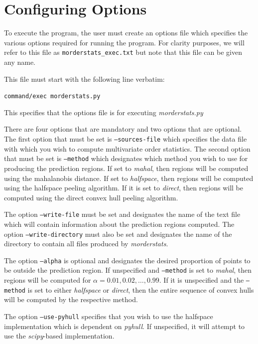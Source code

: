 \documentclass[11pt]{article}
\begin{document}
\section{Configuring Options}

To execute the program, the user must create an options file which specifies the various options required for running the program. For clarity purposes, we will refer to this file as \texttt{morderstats\_exec.txt} but note that this file can be given any name.

This file must start with the following line verbatim:
\begin{center}
	\texttt{command/exec morderstats.py}
\end{center}
This specifies that the options file is for executing \textit{morderstats.py}

There are four options that are mandatory and two options that are optional.
The first option that must be set is \texttt{--sources-file} which specifies the data file with which you wish to compute multivariate order statistics.
The second option that must be set is \texttt{--method} which designates which method you wish to use for producing the prediction regions.
If set to \textit{mahal}, then regions will be computed using the mahalanobis distance.
If set to \textit{halfspace}, then regions will be computed using the halfspace peeling algorithm.
If it is set to \textit{direct}, then regions will be computed using the direct convex hull peeling algorithm.

The option \texttt{--write-file} must be set and designates the name of the text file which will contain information about the prediction regions computed.
The option \texttt{--write-directory} must also be set and designates the name of the directory to contain all files produced by \textit{morderstats}.

The option \texttt{--alpha} is optional and designates the desired proportion of points to be outside the prediction region. If unspecified and \texttt{--method} is set to \textit{mahal}, then regions will be computed for $\alpha = 0.01,0.02,\ldots,0.99$. If it is unspecified and the \texttt{--method} is set to either \textit{halfspace} or \textit{direct}, then the entire sequence of convex hulls will be computed by the respective method.

The option \texttt{--use-pyhull} specifies that you wish to use the halfspace implementation which is dependent on \textit{pyhull}. If unspecified, it will attempt to use the \textit{scipy}-based implementation.
\end{document}
